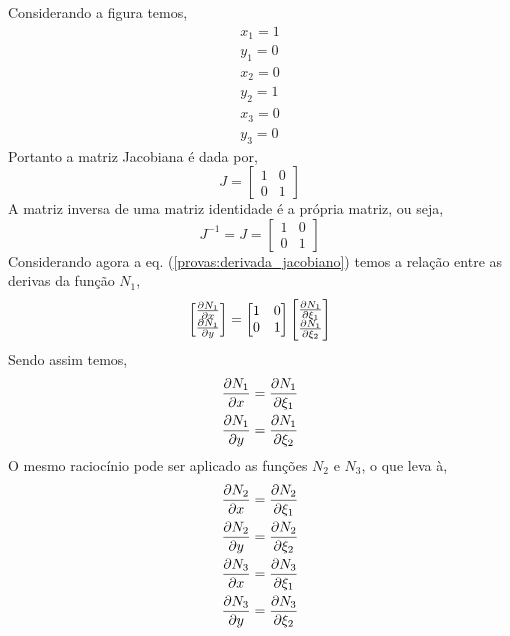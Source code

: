 %
Considerando a figura temos,
\begin{equation}
\begin{split}
x_1 = 1\\
y_1 = 0\\
x_2 = 0\\
y_2 = 1\\
x_3 = 0\\
y_3 = 0
\end{split}
\end{equation} 
% 
Portanto a matriz Jacobiana é dada por,
%
\begin{equation}
	J =	\begin{bmatrix}
		1&0\\
		0&1
		\end{bmatrix}
\end{equation}
%
A matriz inversa de uma matriz identidade é a própria matriz, ou seja,
%
\begin{equation}
	J^{-1} = J =	\begin{bmatrix}
		1&0\\
		0&1
	\end{bmatrix}
\end{equation}
%
Considerando agora a eq. (\ref{provas:derivada_jacobiano}) temos a relação entre as derivas da função $N_1$,
%
\begin{equation}
	\begin{bmatrix}
	\frac{\partial N_1}{\partial x}\\
	\frac{\partial N_1}{\partial y}
	\end{bmatrix}
     = 
	\begin{bmatrix}
	1&0\\
	0&1
	\end{bmatrix}          
	\begin{bmatrix}
	\frac{\partial N_1}{\partial \xi_1}\\
	\frac{\partial N_1}{\partial \xi_2}
	\end{bmatrix} 
\end{equation}
%
Sendo assim temos,
%
\begin{equation}
	\begin{split}
		\frac{\partial N_1}{\partial x} = \frac{\partial N_1}{\partial \xi_1}\\
		\frac{\partial N_1}{\partial y} = \frac{\partial N_1}{\partial \xi_2}
	\end{split}
\end{equation}
%
O mesmo raciocínio pode ser aplicado as funções $N_2$ e $N_3$, o que leva à,
%
\begin{equation}
	\begin{split}
		\frac{\partial N_2}{\partial x} = \frac{\partial N_2}{\partial \xi_1}\\
		\frac{\partial N_2}{\partial y} = \frac{\partial N_2}{\partial \xi_2}\\
		\frac{\partial N_3}{\partial x} = \frac{\partial N_3}{\partial \xi_1}\\
		\frac{\partial N_3}{\partial y} = \frac{\partial N_3}{\partial \xi_2}
	\end{split}
\end{equation}
